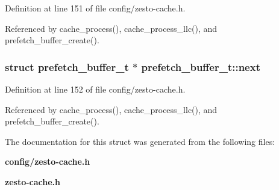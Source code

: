 Definition at line 151 of file config/zesto-cache.h.

Referenced by cache\_\-process(), cache\_\-process\_\-llc(), and prefetch\_\-buffer\_\-create().
\subsubsection[{next}]{\setlength{\rightskip}{0pt plus 5cm}struct {\bf prefetch\_\-buffer\_\-t} $\ast$ {\bf prefetch\_\-buffer\_\-t::next}\hspace{0.3cm}{\tt  [read]}}\label{structprefetch__buffer__t_3bcf468155725705c6c68740a7dc4f6e}




Definition at line 152 of file config/zesto-cache.h.

Referenced by cache\_\-process(), cache\_\-process\_\-llc(), and prefetch\_\-buffer\_\-create().

The documentation for this struct was generated from the following files:\begin{CompactItemize}
\item 
{\bf config/zesto-cache.h}\item 
{\bf zesto-cache.h}\end{CompactItemize}
